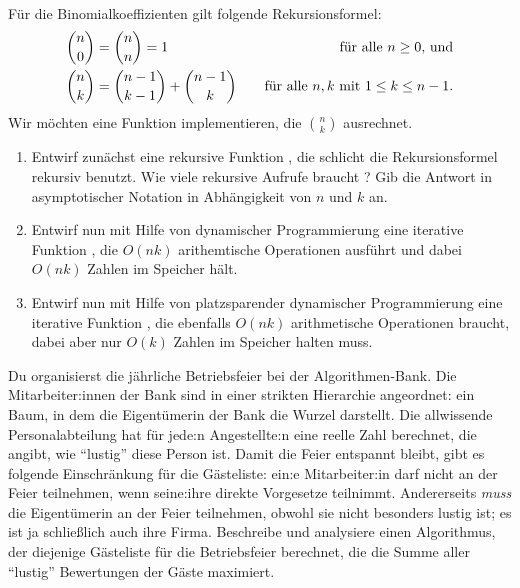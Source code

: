 \documentclass{uebung_cs}
\begin{document}
\begin{aufgabe}\mbox{}\\
    Für die Binomialkoeffizienten gilt folgende Rekursionsformel:
    \begin{align*}
        \binom{n}{0}&=\binom{n}{n}=1&\quad\text{für alle $n\ge 0$, und}\\
        \binom{n}{k}&=\binom{n-1}{k-1}+\binom{n-1}{k}&\quad\text{für alle $n,k$ mit $ 1\le k \le n-1$.}
    \end{align*}
    Wir möchten eine Funktion implementieren, die $\binom{n}{k}$ ausrechnet.
    \begin{enumerate}
        \item\bestehen Entwirf zunächst eine rekursive Funktion , die schlicht die Rekursionsformel rekursiv benutzt. Wie viele rekursive Aufrufe braucht ? Gib die Antwort in asymptotischer Notation in Abhängigkeit von $n$ und $k$ an.
        \item\bestehen Entwirf nun mit Hilfe von dynamischer Programmierung eine iterative Funktion , die $O(nk)$ arithemtische Operationen ausführt und dabei $O(nk)$ Zahlen im Speicher hält.
        \item\mittel Entwirf nun mit Hilfe von platzsparender dynamischer Programmierung eine iterative Funktion , die ebenfalls $O(nk)$ arithmetische Operationen braucht, dabei aber nur $O(k)$ Zahlen im Speicher halten muss.
    \end{enumerate}
\end{aufgabe}
\begin{aufgabe}
    Du organisierst die jährliche Betriebsfeier bei der Algorithmen-Bank.
    Die Mitarbeiter:innen der Bank sind in einer strikten Hierarchie angeordnet: ein Baum, in dem die Eigentümerin der Bank die Wurzel darstellt.
    Die allwissende Personalabteilung hat für jede:n Angestellte:n eine reelle Zahl berechnet, die angibt, wie \enquote{lustig} diese Person ist.
    Damit die Feier entspannt bleibt, gibt es folgende Einschränkung für die Gästeliste:
    ein:e Mitarbeiter:in darf nicht an der Feier teilnehmen, wenn seine:ihre direkte Vorgesetze teilnimmt.
    Andererseits \emph{muss} die Eigentümerin an der Feier teilnehmen, obwohl sie nicht besonders lustig ist; es ist ja schließlich auch ihre Firma.
    Beschreibe und analysiere einen Algorithmus, der diejenige Gästeliste für die Betriebsfeier berechnet, die die Summe aller \enquote{lustig} Bewertungen der Gäste maximiert.
\end{aufgabe}
\end{document}
